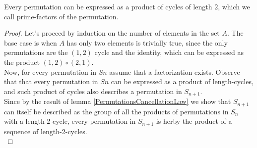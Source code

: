 \begin{theorem} 
\label{PermutationsFactorization}
    Every permutation can be expressed as a product of cycles 
    of length $2$, which we call prime-factors of the permutation.
\end{theorem} 
\begin{proof}
    Let's proceed by 
    induction on the number of elements in the set $A$. The base case is when $A$ has only 
    two elements is trivially true, since the only permutations are the $(1,2)$ cycle and 
    the identity, which can be expressed as the product $(1,2) \circ (2,1)$. \\

    Now, for every permutation in $Sn$ assume that a factorization exists. Observe that 
    that every permutation in $Sn$ can be expressed as a product of length-cycles, and such product 
    of cycles also describes a permutation in $S_{n+1}$. \\
    
    Since by the result of lemma \ref{PermutationsCancellationLaw} we show that 
    $S_{n+1}$ can itself be described as the group of all the products of permutations in 
    $S_{n}$ with a length-2-cycle, every permutation in $S_{n+1}$ is herby the product of 
    a sequence of length-2-cycles. \\
\end{proof} \vspace{0.2em}

\newpage